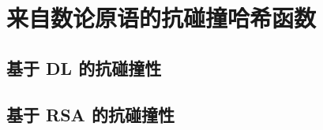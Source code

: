 \section{来自数论原语的抗碰撞哈希函数}\label{sec:10-6}

\subsection{基于 DL 的抗碰撞性}\label{subsec:10-6-1}

\begin{fact}[使用两种表示计算 DL]\label{fact:10-3}
	
\end{fact}

\begin{theorem}\label{theo:10-4}
	
\end{theorem}

\subsection{基于 RSA 的抗碰撞性}\label{subsec:10-6-2}

\begin{theorem}\label{theo:10-5}
	
\end{theorem}

\begin{theorem}[Shamir 技巧]\label{theo:10-6}
	
\end{theorem}

\begin{theorem}\label{theo:10-7}
	
\end{theorem}